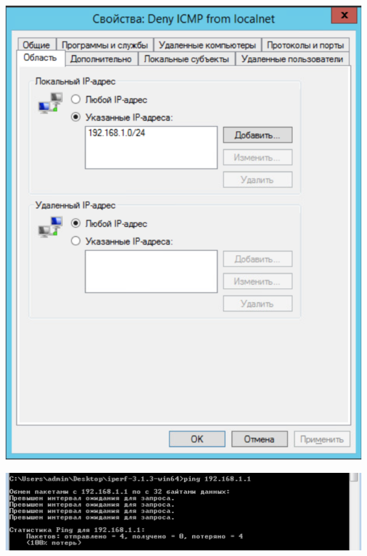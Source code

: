 \documentclass[a4paper,14pt]{extarticle}
\begin{document}
    \begin{center}
        \includegraphics[scale=0.7]{7.6.2.png}
    \end{center}

    \begin{center}
        \includegraphics[scale=0.8]{7.6.3.png}
    \end{center}
\end{document}
